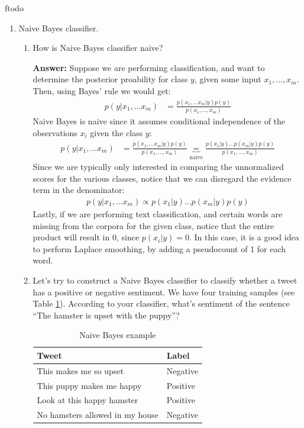 ƒtodo\documentclass{article}
\newenvironment{QandA}{\begin{enumerate}[label=\arabic*.]}{\end{enumerate}}
\newenvironment{InnerQandA}{\begin{enumerate}[label=\roman*.]}{\end{enumerate}}
\newenvironment{answer}{\par\normalfont \textbf{Answer:}}{}
\newcommand{\g}{\vert}
\begin{document}
\begin{QandA}
    \item Naive Bayes classifier.
    \begin{InnerQandA}
        \item How is Naive Bayes classifier naive?
        \begin{answer}
            Suppose we are performing classification, and want to determine the posterior proability for class $y$, given some input $x_1, \ldots, x_m$. Then, using Bayes' rule we would get:
            \begin{align*}
                p(y \g x_1, \ldots x_m) &= \frac{p(x_1, \ldots x_m \g y) p(y)}{p(x_1, \ldots, x_m)}
            \end{align*}
            Naive Bayes is naive since it assumes conditional independence of the observations $x_i$ given the class $y$:
            \begin{align*}
                p(y \g x_1, \ldots x_m) &= \frac{p(x_1, \ldots x_m \g y) p(y)}{p(x_1, \ldots, x_m)} \underbrace{=}_{\text{naive}} \frac{p(x_1 \g y) \hdots p(x_m \g y) p(y)}{p(x_1, \ldots, x_m)}
            \end{align*} 
            Since we are typically only interested in comparing the unnormalized scores for the various classes, notice that we can disregard the evidence term in the denominator:
            \begin{align*}
                p(y \g x_1, \ldots x_m) \propto p(x_1 \g y) \hdots p(x_m \g y) p(y)
            \end{align*}
            Lastly, if we are performing text classification, and certain words are missing from the corpora for the given class, notice that the entire product will result in $0$, since $p(x_i \g y) = 0$. In this case, it is a good idea to perform Laplace smoothing, by adding a pseudocount of 1 for each word.
        \end{answer}

        \item Let’s try to construct a Naive Bayes classifier to classify whether a tweet has a positive or negative sentiment. We have four training samples (see Table \ref{tab:naive-bayes}). According to your classifier, what's sentiment of the sentence ``The hamster is upset with the puppy''?
        \begin{table}[h!]
        \centering
        \begin{tabular}{|l|l|}
        \hline
        \textbf{Tweet}                  & \textbf{Label} \\ \hline
        This makes me so upset          & Negative       \\ \hline
        This puppy makes me happy       & Positive       \\ \hline
        Look at this happy hamster      & Positive       \\ \hline
        No hamsters allowed in my house & Negative       \\ \hline
        \end{tabular}
        \caption{Naive Bayes example}
        \label{tab:naive-bayes}
        \end{table}
        

\end{InnerQandA}
\end{QandA}
\end{document}
